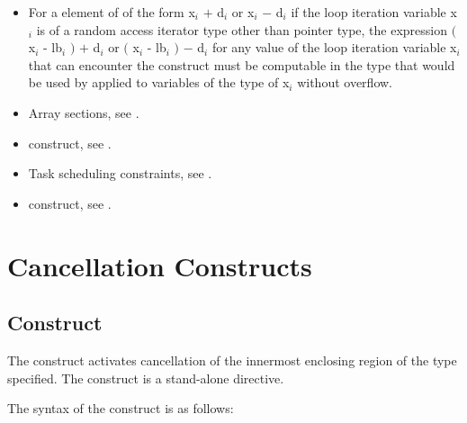 {{{{\begin{itemize}
\cppspecificstart
\item For a  element of   of the form
x$_{i}$ $+$ d$_{i}$ or x$_{i}$ $-$ d$_{i}$ if the loop iteration variable
x$_{i}$ is of a random access iterator type other than pointer type,
the expression $($ x$_{i}$ - lb$_{i}$ $)$ $+$ d$_{i}$ or
$($ x$_{i}$ - lb$_{i}$ $)$ $-$ d$_{i}$ for any value of the loop iteration variable
x$_{i}$ that can encounter the  construct must be computable in the
type that would be used by  applied to variables of the
type of x$_{i}$ without overflow.
\cppspecificend

\end{itemize}

\crossreferences
\begin{itemize}
\item Array sections, see
.

\item {} construct, see 
.

\item Task scheduling constraints, see
. 

\item {} construct, see
. 
\end{itemize}







\section{Cancellation Constructs}
\label{sec:Cancellation Constructs}
\subsection{ Construct}
\label{subsec:cancel Construct}
\summary
The  construct activates cancellation of the innermost enclosing region of the 
type specified. The  construct is a stand-alone directive.

\syntax
\ccppspecificstart
The syntax of the  construct is as follows:

}}}}
